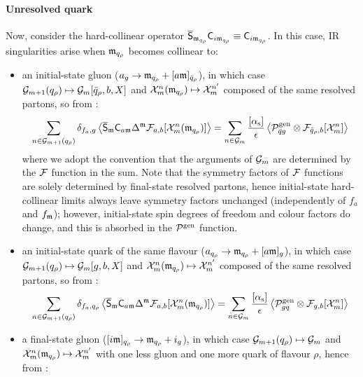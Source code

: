 \paragraph{Unresolved quark}

Now, consider the hard-collinear operator $ \overline{\mathsf{S}}_{\mathfrak{m}_{q_\rho}} \mathsf{C}_{i\mathfrak{m}_{q_\rho}} \equiv \mathsf{C}_{i\mathfrak{m}_{q_\rho}} $. In this case, IR singularities arise when $ \mathfrak{m}_{q_\rho} $ becomes collinear to:
\begin{itemize}
  \item an initial-state gluon ($ a_g \rightarrow \mathfrak{m}_{q_\rho} + [a\mathfrak{m}]_{\bar{q}_\rho} $), in which case $ \mathcal{G}_{m+1}(q_\rho) \mapsto \mathcal{G}_m[\bar{q}_\rho , b , X] $ and $ \mathcal{X}^{n}_{m}(\mathfrak{m}_{q_\rho}) \mapsto \mathcal{X}^{n'}_{m} $ composed of the same resolved partons, so from :
  \begin{equation*}
    \sum_{n \in \mathcal{G}_{m+1}(q_\rho)} \delta_{f_a , g} \left\langle \overline{\mathsf{S}}_{\mathfrak{m}} \mathsf{C}_{a\mathfrak{m}} \Delta^{\mathfrak{m}} \mathcal{F}_{a,b}[\mathcal{X}^{n}_{m}(\mathfrak{m}_{q_\rho})] \right\rangle = \sum_{n \in \mathcal{G}_m} \frac{[\alpha_\text{s}]}{\epsilon} \left\langle \mathcal{P}^\text{gen}_{\bar{q} g} \otimes \mathcal{F}_{\bar{q}_\rho , b}[\mathcal{X}^{n}_{m}] \right\rangle
  \end{equation*}
  where we adopt the convention that the arguments of $ \mathcal{G}_m $ are determined by the $ \mathcal{F} $ function in the sum. Note that the symmetry factors of $ \mathcal{F} $ functions are solely determined by final-state resolved partons, hence initial-state hard-collinear limits always leave symmetry factors unchanged (independently of $ f_a $ and $ f_{\mathfrak{m}} $); however, initial-state spin degrees of freedom and colour factors do change, and this is absorbed in the $ \mathcal{P}^\text{gen} $ function.
  \item an initial-state quark of the same flavour ($ a_{q_\rho} \rightarrow \mathfrak{m}_{q_\rho} + [a\mathfrak{m}]_g $), in which case $ \mathcal{G}_{m+1}(q_\rho) \mapsto \mathcal{G}_m[g,b,X] $ and $ \mathcal{X}^{n}_{m}(\mathfrak{m}_{q_\rho}) \mapsto \mathcal{X}^{n'}_{m} $ composed of the same resolved partons, so from :
  \begin{equation*}
    \sum_{n \in \mathcal{G}_{m+1}(q_\rho)} \delta_{f_a , q_\rho} \left\langle \overline{\mathsf{S}}_{\mathfrak{m}} \mathsf{C}_{a\mathfrak{m}} \Delta^{\mathfrak{m}} \mathcal{F}_{a,b}[\mathcal{X}^{n}_{m}(\mathfrak{m}_{q_\rho})] \right\rangle = \sum_{n \in \mathcal{G}_m} \frac{[\alpha_\text{s}]}{\epsilon} \left\langle \mathcal{P}^\text{gen}_{gq} \otimes \mathcal{F}_{g,b}[\mathcal{X}^{n}_{m}] \right\rangle
  \end{equation*}
  \item a final-state gluon ($ [i\mathfrak{m}]_{q_\rho} \rightarrow \mathfrak{m}_{q_\rho} + i_g $), in which case $ \mathcal{G}_{m+1} (q_\rho) \mapsto \mathcal{G}_{m} $ and $ \mathcal{X}^{n}_{m}(\mathfrak{m}_{q_\rho}) \mapsto \mathcal{X}^{n'}_{m} $ with one less gluon and one more quark of flavour $ \rho $, hence from :
  \begin{equation*}

\end{equation*}
\end{itemize}
